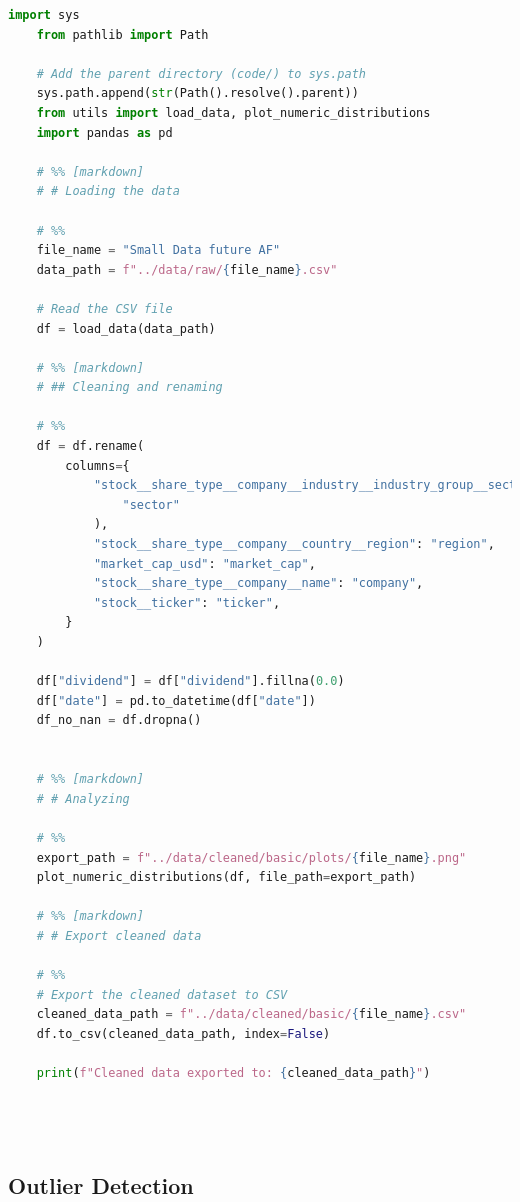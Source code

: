 \documentclass[11pt,english,a4paper,hidelinks]{book}
\begin{document}
\begin{lstlisting}[language=Python, caption=Basic Data Cleaning, label={lst:data_cleaning}]
    import sys
    from pathlib import Path
    
    # Add the parent directory (code/) to sys.path
    sys.path.append(str(Path().resolve().parent))
    from utils import load_data, plot_numeric_distributions
    import pandas as pd
    
    # %% [markdown]
    # # Loading the data
    
    # %%
    file_name = "Small Data future AF"
    data_path = f"../data/raw/{file_name}.csv"
    
    # Read the CSV file
    df = load_data(data_path)
    
    # %% [markdown]
    # ## Cleaning and renaming
    
    # %%
    df = df.rename(
        columns={
            "stock__share_type__company__industry__industry_group__sector__name": (
                "sector"
            ),
            "stock__share_type__company__country__region": "region",
            "market_cap_usd": "market_cap",
            "stock__share_type__company__name": "company",
            "stock__ticker": "ticker",
        }
    )
    
    df["dividend"] = df["dividend"].fillna(0.0)
    df["date"] = pd.to_datetime(df["date"])
    df_no_nan = df.dropna()

    
    # %% [markdown]
    # # Analyzing
    
    # %%
    export_path = f"../data/cleaned/basic/plots/{file_name}.png"
    plot_numeric_distributions(df, file_path=export_path)
    
    # %% [markdown]
    # # Export cleaned data
    
    # %%
    # Export the cleaned dataset to CSV
    cleaned_data_path = f"../data/cleaned/basic/{file_name}.csv"
    df.to_csv(cleaned_data_path, index=False)
    
    print(f"Cleaned data exported to: {cleaned_data_path}")
    
    
    
\end{lstlisting}

\subsection{Outlier Detection}

\begin{lstlisting}[language=Python, caption=Outlier Detection, label={lst:outlier_detection}]

\end{lstlisting}
\end{document}
